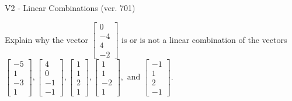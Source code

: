 \begin{exercise}
  \begin{exerciseTitle}V2 - Linear Combinations (ver. 701)\end{exerciseTitle}
  \begin{exerciseStatement}
    Explain why the vector \(\left[\begin{array}{c}
0 \\
-4 \\
4 \\
-2
\end{array}\right]\)  is or is not a linear 
	combination of the vectors \(\left[\begin{array}{c}
-5 \\
1 \\
-3 \\
1
\end{array}\right] , \left[\begin{array}{c}
4 \\
0 \\
-1 \\
-1
\end{array}\right] , \left[\begin{array}{c}
1 \\
1 \\
2 \\
1
\end{array}\right] , \left[\begin{array}{c}
1 \\
1 \\
-2 \\
1
\end{array}\right] , \text{ and } \left[\begin{array}{c}
-1 \\
1 \\
2 \\
-1
\end{array}\right]\).
	



\end{exerciseStatement}
\end{exercise}
